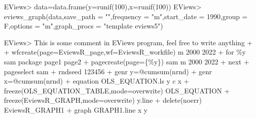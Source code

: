 \documentclass[
]{article}
\newenvironment{Shaded}{\begin{snugshade}}{\end{snugshade}}
\newcommand{\AttributeTok}[1]{\textcolor[rgb]{0.77,0.63,0.00}{#1}}
\newcommand{\DecValTok}[1]{\textcolor[rgb]{0.00,0.00,0.81}{#1}}
\newcommand{\FunctionTok}[1]{\textcolor[rgb]{0.00,0.00,0.00}{#1}}
\newcommand{\NormalTok}[1]{#1}
\newcommand{\OtherTok}[1]{\textcolor[rgb]{0.56,0.35,0.01}{#1}}
\newcommand{\SpecialCharTok}[1]{\textcolor[rgb]{0.00,0.00,0.00}{#1}}
\newcommand{\StringTok}[1]{\textcolor[rgb]{0.31,0.60,0.02}{#1}}
\begin{document}
\begin{Shaded}
\begin{Highlighting}[]
\NormalTok{EViews}\SpecialCharTok{\textgreater{}}\NormalTok{ data}\OtherTok{=}\FunctionTok{data.frame}\NormalTok{(}\AttributeTok{y=}\FunctionTok{runif}\NormalTok{(}\DecValTok{100}\NormalTok{),}\AttributeTok{x=}\FunctionTok{runif}\NormalTok{(}\DecValTok{100}\NormalTok{))}
\NormalTok{EViews}\SpecialCharTok{\textgreater{}} \FunctionTok{eviews\_graph}\NormalTok{(data,}\AttributeTok{save\_path =} \StringTok{""}\NormalTok{,}\AttributeTok{frequency =} \StringTok{"m"}\NormalTok{,}\AttributeTok{start\_date =} \DecValTok{1990}\NormalTok{,}\AttributeTok{group =}\NormalTok{ F,}\AttributeTok{options =} \StringTok{"m"}\NormalTok{,}\AttributeTok{graph\_procs =} \StringTok{"template eviews5"}\NormalTok{)}
\end{Highlighting}
\end{Shaded}

\begin{Shaded}
\end{Shaded}

\begin{Shaded}
\begin{Highlighting}[]
\NormalTok{EViews\textgreater{} \textquotesingle{}This is some comment in EViews program, feel free to write anything}
\NormalTok{+ }
\NormalTok{+ wfcreate(page=EviewsR\_page,wf=EviewsR\_workfile) m 2000 2022}
\NormalTok{+ for \%y sam package page1 page2}
\NormalTok{+ pagecreate(page=\{\%y\}) sam m 2000 2022}
\NormalTok{+ next}
\NormalTok{+ pageselect sam}
\NormalTok{+ rndseed 123456}
\NormalTok{+ genr y=@cumsum(nrnd)}
\NormalTok{+ genr x=@cumsum(nrnd)}
\NormalTok{+ equation OLS\_EQUATION.ls y c x}
\NormalTok{+ freeze(OLS\_EQUATION\_TABLE,mode=overwrite) OLS\_EQUATION}
\NormalTok{+ freeze(EviewsR\_GRAPH,mode=overwrite) y.line}
\NormalTok{+ delete(noerr) EviewsR\_GRAPH1}
\NormalTok{+ graph GRAPH1.line x y}
\end{Highlighting}
\end{Shaded}
\end{document}
